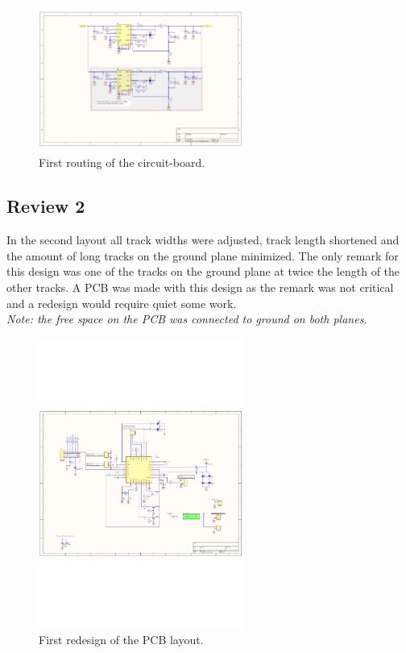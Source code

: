 \begin{figure}[H]
	\begin{centering}
		 \includegraphics[width=0.6\textwidth,page=3,angle=0]{images/SIG60_v0_1}
		\caption{First routing of the circuit-board.}
	\end{centering}
\end{figure}

\subsection{Review 2}
In the second layout all track widths were adjusted, track length shortened and the amount of long tracks on the ground plane minimized. The only remark for this design was one of the tracks on the ground plane at twice the length of the other tracks. A PCB was made with this design as the remark was not critical and a redesign would require quiet some work.
\\\textit{Note: the free space on the PCB was connected to ground on both planes.}
\begin{figure}[H]
	\begin{centering}
		 \includegraphics[width=0.6\textwidth,page=3,angle=0]{images/SIG60_v0_2}
		\caption{First redesign of the PCB layout.}
	\end{centering}
\end{figure}
